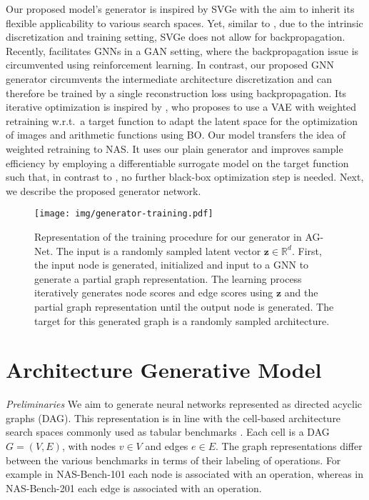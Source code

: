 \documentclass[runningheads]{llncs}
\begin{document}
Our proposed model's generator is inspired by SVGe with the aim to inherit its flexible applicability to various search spaces. Yet, similar to \cite{2020Arch2vec}, due to the intrinsic discretization and training setting, SVGe does not allow for backpropagation. 
Recently, \cite{2021GANAS} facilitates GNNs in a GAN \cite{2014GAN} setting, where the backpropagation issue is circumvented using reinforcement learning. 
In contrast, our proposed GNN generator circumvents the intermediate architecture discretization and can therefore be trained by a single reconstruction loss using backpropagation.
Its iterative optimization is inspired by \cite{2020Reweighting}, who proposes to use a VAE with weighted retraining w.r.t.~a target function to adapt the latent space for the optimization of images and arithmetic functions using BO. Our model transfers the idea of weighted retraining to NAS. It uses our plain generator and improves sample efficiency by employing a differentiable surrogate model on the target function such that, in contrast to \cite{2020Reweighting}, no further black-box optimization step is needed. Next, we describe the proposed generator network.




\begin{figure}[t!]

    \centering
    \texttt{[image: img/generator-training.pdf]}
    \caption{Representation of the training procedure for our generator in AG-Net. The input is a randomly sampled latent vector $\mathbf{z} \in \mathbb{R}^d$. First, the input node is generated, initialized and input to a GNN to generate a partial graph representation. The learning process iteratively generates node scores and edge scores using $\mathbf{z}$ and the partial graph representation until the output node is generated. The target for this generated graph is a randomly sampled architecture.    
    }
    \label{fig:generator-training}
\end{figure}

\section{Architecture Generative Model}
\noindent \textit{Preliminaries}
We aim to generate neural networks represented as directed acyclic graphs (DAG).
This representation is in line with the cell-based architecture search spaces commonly used as tabular benchmarks \cite{2019NB101,2020NB201}.
Each cell is a DAG $G=(V,E)$, with nodes $v \in V$ and edges $e \in E$.
The graph representations differ between the various benchmarks in terms of their labeling of operations.
For example in NAS-Bench-101 \cite{2019NB101} each node is associated with an operation, whereas in NAS-Bench-201 \cite{2020NB201} each edge is associated with an operation.
\end{document}
